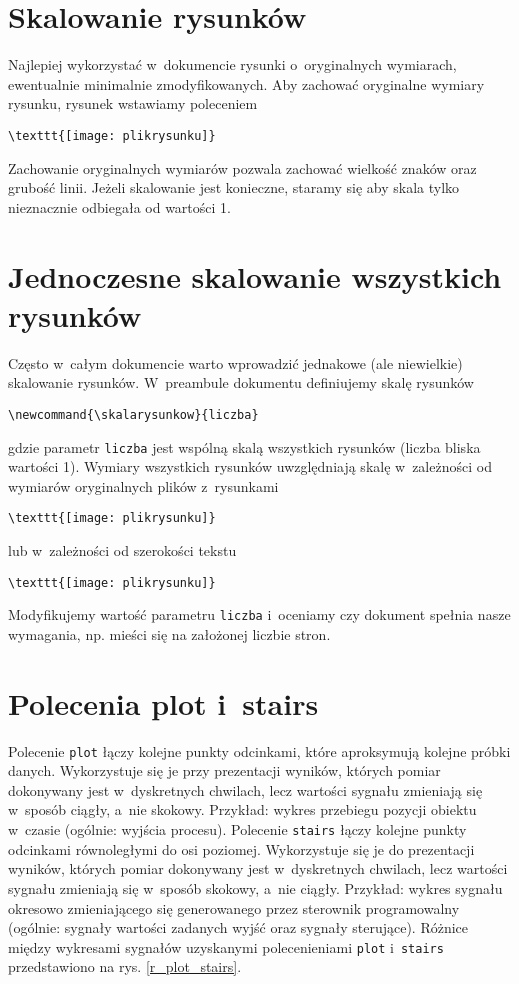 \section{Skalowanie rysunków}
Najlepiej wykorzystać w~dokumencie rysunki o~oryginalnych wymiarach, ewentualnie minimalnie zmodyfikowanych. Aby zachować oryginalne wymiary rysunku, rysunek wstawiamy poleceniem
\begin{lstlisting}[style=customlatex,frame=single]
\texttt{[image: plikrysunku]}
\end{lstlisting}
Zachowanie oryginalnych wymiarów pozwala zachować wielkość znaków oraz grubość linii. Jeżeli skalowanie jest konieczne, staramy się aby skala tylko nieznacznie odbiegała od wartości 1.

\section{Jednoczesne skalowanie wszystkich rysunków}
Często w~całym dokumencie warto wprowadzić jednakowe (ale niewielkie) skalowanie rysunków. W~preambule dokumentu definiujemy skalę rysunków
\begin{lstlisting}[style=customlatex,frame=single]
\newcommand{\skalarysunkow}{liczba}
\end{lstlisting}
gdzie parametr \verb+liczba+ jest wspólną skalą wszystkich rysunków (liczba bliska wartości 1). Wymiary wszystkich rysunków uwzględniają skalę w~zależności od wymiarów oryginalnych plików z~rysunkami
\begin{lstlisting}[style=customlatex,frame=single]
\texttt{[image: plikrysunku]}
\end{lstlisting}
lub w~zależności od szerokości tekstu
\begin{lstlisting}[style=customlatex,frame=single]
\texttt{[image: plikrysunku]}
\end{lstlisting}
Modyfikujemy wartość parametru \verb+liczba+ i~oceniamy czy dokument spełnia nasze wymagania, np. mieści się na założonej liczbie stron.

\section{Polecenia plot i~stairs}
Polecenie \verb+plot+ łączy kolejne punkty odcinkami, które aproksymują kolejne próbki danych. Wykorzystuje się je przy prezentacji wyników, których pomiar dokonywany jest w~dyskretnych chwilach, lecz wartości sygnału zmieniają się w~sposób ciągły, a~nie skokowy. Przykład: wykres przebiegu pozycji obiektu w~czasie (ogólnie: wyjścia procesu). Polecenie \verb+stairs+ łączy kolejne punkty odcinkami równoległymi do osi poziomej. Wykorzystuje się je do prezentacji wyników, których pomiar dokonywany jest w~dyskretnych chwilach, lecz wartości sygnału zmieniają się w~sposób skokowy, a~nie ciągły. Przykład: wykres sygnału okresowo zmieniającego się generowanego przez sterownik programowalny (ogólnie: sygnały wartości zadanych wyjść oraz sygnały sterujące). Różnice między wykresami sygnałów uzyskanymi polecenieniami \texttt{plot} i~\texttt{stairs} przedstawiono na rys. \ref{r_plot_stairs}.

